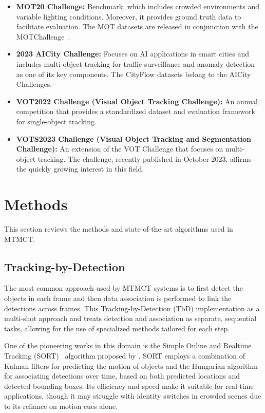\begin{itemize}
    \item \textbf{MOT20 Challenge:} Benchmark, which includes crowded environments and variable lighting conditions. Moreover, it provides ground truth data to facilitate evaluation. The MOT datasets are released in conjunction with the MOTChallenge~\cite{Dendorfer20}.
    \item \textbf{2023 AICity Challenge:} Focuses on AI applications in smart cities and includes multi-object tracking for traffic surveillance and anomaly detection as one of its key components. The CityFlow datasets belong to the AICity Challenges.~\cite{Naphade23}
    \item \textbf{VOT2022 Challenge (Visual Object Tracking Challenge):} An annual competition that provides a standardized dataset and evaluation framework for single-object tracking.~\cite{Kristan22}
    \item \textbf{VOTS2023 Challenge (Visual Object Tracking and Segmentation Challenge):} An extension of the VOT Challenge that focuses on multi-object tracking. The challenge, recently published in October 2023, affirms the quickly growing interest in this field.~\cite{Kristan23}
\end{itemize}

\section{Methods}\label{sec:methods}
This section reviews the methods and state-of-the-art algorithms used in MTMCT.

\subsection{Tracking-by-Detection}\label{subsec:tracking_by_detection}
The most common approach used by MTMCT systems is to first detect the objects in each frame and then data association is performed to link the detections across frames. This Tracking-by-Detection (TbD) implementation as a multi-shot approach and treats detection and association as separate, sequential tasks, allowing for the use of specialized methods tailored for each step.

One of the pioneering works in this domain is the Simple Online and Realtime Tracking (SORT)~\cite{Bewley16} algorithm proposed by \citeauthor{Bewley16}. SORT employs a combination of Kalman filters for predicting the motion of objects and the Hungarian algorithm for associating detections over time, based on both predicted locations and detected bounding boxes. Its efficiency and speed make it suitable for real-time applications, though it may struggle with identity switches in crowded scenes due to its reliance on motion cues alone.

